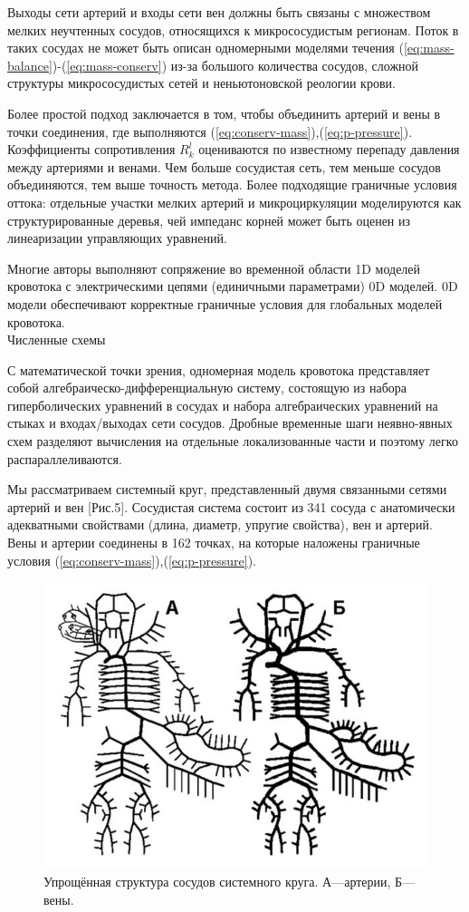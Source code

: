 Выходы сети артерий и входы сети вен должны быть связаны с множеством мелких неучтенных сосудов, относящихся к микрососудистым регионам. Поток в таких сосудах не может быть описан одномерными моделями течения (\ref{eq:mass-balance})-(\ref{eq:mass-conserv}) из-за большого количества сосудов, сложной структуры микрососудистых сетей и неньютоновской реологии крови.

Более простой подход заключается в том, чтобы объединить артерий и вены в точки соединения, где выполняются (\ref{eq:conserv-mass}),(\ref{eq:p-pressure}). Коэффициенты сопротивления $ R^l_k$ оцениваются  по известному перепаду давления между артериями и венами. Чем больше сосудистая сеть, тем меньше сосудов объединяются, тем выше точность метода. Более подходящие граничные условия оттока: отдельные участки мелких артерий и микроциркуляции моделируются как структурированные деревья, чей импеданс корней может быть оценен из линеаризации управляющих уравнений.

Многие авторы \cite{alastruey:2008} выполняют сопряжение во временной области 1D моделей кровотока с электрическими цепями (единичными параметрами) 0D моделей. 0D модели обеспечивают корректные граничные условия для глобальных моделей кровотока.
\\
Численные схемы

С математической точки зрения, одномерная модель кровотока представляет собой алгебраическо-дифференциальную систему, состоящую из набора гиперболических уравнений в сосудах и набора алгебраических уравнений на стыках и входах/выходах сети сосудов. Дробные временные шаги неявно-явных схем разделяют вычисления на отдельные локализованные части и поэтому легко распараллеливаются.

Мы рассматриваем системный круг, представленный двумя связанными сетями артерий и вен [Рис.5]. Сосудистая система состоит из 341 сосуда с анатомически адекватными свойствами (длина, диаметр, упругие свойства), вен и артерий. Вены и артерии соединены в 162 точках, на которые наложены граничные условия (\ref{eq:conserv-mass}),(\ref{eq:p-pressure}). 

\begin{figure}[h]
\centering
\includegraphics[width=0.5\linewidth]{krug.png}
\caption{Упрощённая структура сосудов системного круга. А—артерии, Б—вены.}
\label{fig:mpr}
\end{figure}

